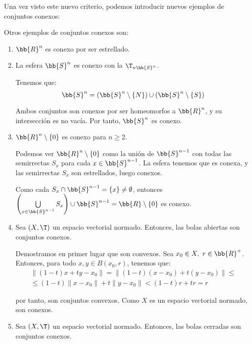 Una vez visto este nuevo criterio, podemos introducir nuevos ejemplos de conjuntos conexos:
\begin{ejemplo}
    Otros ejemplos de conjuntos conexos son:
    \begin{enumerate}
        \item $\bb{R}^n$ es conexo por ser estrellado.
        \item \label{ex:SnConexo}
        La esfera $\bb{S}^n$ es conexo con la ${\T_u}_{\bb{S}^n}$.

        Tenemos que:
        \begin{equation*}
            \bb{S}^n=(\bb{S}^n\setminus \{N\}) \cup (\bb{S}^n\setminus \{S\})
        \end{equation*}
    
        Ambos conjuntos son conexos por ser homeomorfos a $\bb{R}^n$, y su intersección es no vacía. Por tanto, $\bb{S}^n$ es conexo.

        \item $\bb{R}^n \setminus \{0\}$ es conexo para $n\geq 2$.

        Podemos ver $\bb{R}^n\setminus \{0\}$ como la unión de $\bb{S}^{n-1}$ con todas las semirrectas $S_x$ para cada $x\in \bb{S}^{n-1}$. La esfera tenemos que es conexa, y las semirrectas $S_x$ son estrellados, luego conexos.

        Como cada $S_x\cap \bb{S}^{n-1}=\{x\}\neq \emptyset$, entonces $\left(\bigcup\limits_{x\in \bb{S}^{n-1}}S_x\right)\cup \bb{S}^{n-1}=\bb{R}\setminus \{0\}$ es conexo.

        \item Sea $(X,\T)$ un espacio vectorial normado. Entonces, las bolas abiertas son conjuntos conexos.
        
        Demostramos en primer lugar que son convexos. Sea $x_0\in X,~r\in \bb{R}^+$. Entonces, para todo $x,y\in B(x_0,r)$, tenemos que:
        \begin{multline*}
            \|(1-t)x + ty- x_0\| = \|(1-t)(x-x_0) + t(y-x_0)\| \leq \\ \leq (1-t)\|x-x_0\| + t\|y-x_0\| < (1-t)r + tr = r
        \end{multline*}

        por tanto, son conjuntos convexos. Como $X$ es un espacio vectorial normado, son conexos.

        \item Sea $(X,\T)$ un espacio vectorial normado. Entonces, las bolas cerradas son conjuntos conexos.
    \end{enumerate}


\end{ejemplo}
